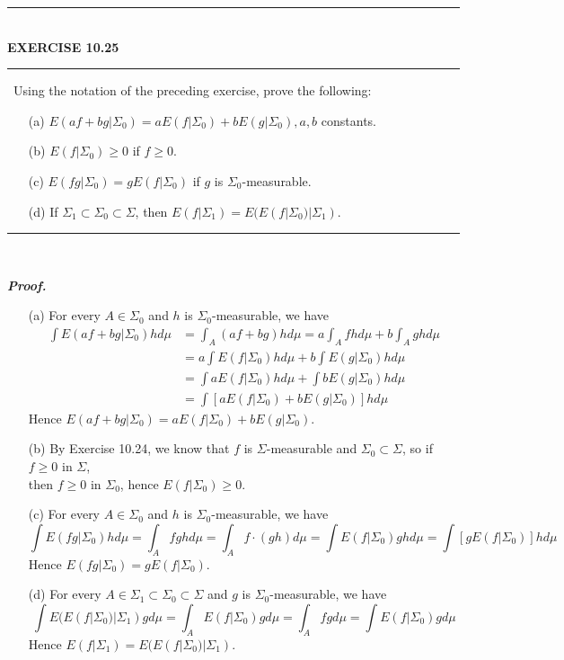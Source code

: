 \documentclass[a4paper,11pt]{article}
\begin{document}
	\begin{flushleft}
		\rule[-0.5ex]{17cm}{2pt}\\
			\textbf{EXERCISE 10.25}\\
		\rule[1.5ex]{17cm}{0.5pt}\
		Using the notation of the preceding exercise, prove the following:
		\begin{enumerate}
			\item [(a)]
				$E(af + bg|\Sigma_0) = aE(f|\Sigma_0) + bE(g|\Sigma_0), a, b$ constants.
			\item [(b)]
				$E(f|\Sigma_0) \geq 0$ if $f \geq 0$.
			\item [(c)]
				$E(fg|\Sigma_0) = gE(f|\Sigma_0)$ if $g$ is $\Sigma_0$-measurable.
			\item [(d)]
				If $\Sigma_1 \subset \Sigma_0 \subset \Sigma$, then $E(f|\Sigma_1) = E(E(f|\Sigma_0)|\Sigma_1)$.
		\end{enumerate}
	\rule[1.0ex]{17cm}{0.5pt}\
	\end{flushleft}
	\textit{\textbf{Proof.}}
	\begin{enumerate}
		\item [(a)]
			For every $A \in \Sigma_0$ and $h$ is $\Sigma_0$-measurable, we have
				$$\begin{aligned}
				\int E(af + bg | \Sigma_0) h d\mu
				&= \int_{A} (af + bg) h d\mu
				= a\int_{A} fh d\mu + b\int_{A} gh d\mu\\
				&= a\int E(f|\Sigma_0) h d\mu + b \int E(g|\Sigma_0) h d\mu\\
				&= \int aE(f|\Sigma_0) h d\mu + \int b E(g|\Sigma_0) h d\mu\\
				&= \int [aE(f|\Sigma_0) + b E(g|\Sigma_0)] h d\mu
				\end{aligned}$$
			Hence $E(af + bg|\Sigma_0) = aE(f|\Sigma_0) + bE(g|\Sigma_0)$.\\

		\item [(b)]
			By Exercise 10.24, we know that $f$ is $\Sigma$-measurable and $\Sigma_0 \subset \Sigma$, so if $f \geq 0$ in $\Sigma$,\\
			then $f \geq 0$ in $\Sigma_0$, hence $E(f|\Sigma_0) \geq 0$.\\
			
		\item [(c)]
			For every $A \in \Sigma_0$ and $h$ is $\Sigma_0$-measurable, we have
				$$\int E(fg | \Sigma_0) h d\mu
				= \int_A fgh d\mu = \int_A f \cdot (gh) d\mu
				= \int E(f|\Sigma_0) gh d\mu
				= \int [gE(f|\Sigma_0)]h d\mu$$
			Hence $E(fg | \Sigma_0) = gE(f | \Sigma_0)$.\\
			
		\item [(d)]
			For every $A \in \Sigma_1 \subset \Sigma_0 \subset \Sigma$ and $g$ is $\Sigma_0$-measurable, we have
				$$\int E(E(f | \Sigma_0)|\Sigma_1) g d\mu
				= \int_A E(f | \Sigma_0) g d\mu
				= \int_A fg d\mu
				= \int E(f|\Sigma_0)g d\mu$$
			Hence $E(f|\Sigma_1) = E(E(f|\Sigma_0)|\Sigma_1)$.
			
	\end{enumerate}
\end{document}

